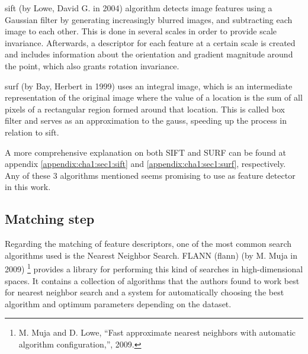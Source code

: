 \acrshort{sift} (by Lowe, David G. in 2004) \cite{sift} algorithm detects image features using a Gaussian filter by generating increasingly blurred images, and subtracting each image to each other. This is done in several scales in order to provide scale invariance. Afterwards, a descriptor for each feature at a certain scale is created and includes information about the orientation and gradient magnitude around the point, which also grants rotation invariance.

\acrshort{surf} (by Bay, Herbert in 1999) \cite{surf} uses an integral image, which is an intermediate representation of the original image where the value of a location is the sum of all pixels of a rectangular region formed around that location. This is called box filter and serves as an approximation to the \gls{gauss}, speeding up the process in relation to \acrshort{sift}.

A more comprehensive explanation on both SIFT and SURF can be found at appendix \ref{appendix:cha1:sec1:sift} and \ref{appendix:cha1:sec1:surf}, respectively. Any of these 3 algorithms mentioned seems promising to use as feature detector in this work.

\subsection{Matching step}
Regarding the matching of feature descriptors, one of the most common search algorithms used is the Nearest Neighbor Search. FLANN (\acrlong{flann}) (by M. Muja in 2009) \footnote{M. Muja and D. Lowe, “Fast approximate nearest neighbors with automatic algorithm configuration,”, 2009.} provides a library for performing this kind of searches in high-dimensional spaces. It contains a collection of algorithms that the authors found to  work best for nearest neighbor search and a system for automatically choosing the best algorithm and optimum parameters depending on the dataset.


